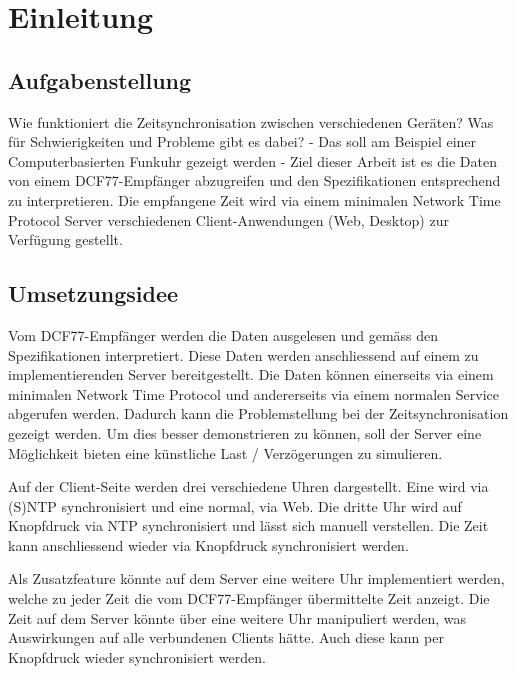 
\chapter{Einleitung}



\section{Aufgabenstellung}

Wie funktioniert die Zeitsynchronisation zwischen verschiedenen Geräten? Was für Schwierigkeiten und Probleme gibt es dabei? - Das soll am Beispiel einer Computerbasierten Funkuhr gezeigt werden - Ziel dieser Arbeit ist es die Daten von einem DCF77-Empfänger abzugreifen und den Spezifikationen entsprechend zu interpretieren. Die empfangene Zeit wird via einem minimalen Network Time Protocol Server verschiedenen Client-Anwendungen (Web, Desktop) zur Verfügung gestellt.

\section{Umsetzungsidee}

Vom DCF77-Empfänger werden die Daten ausgelesen und gemäss den Spezifikationen interpretiert. Diese Daten werden anschliessend auf einem zu implementierenden Server bereitgestellt. Die Daten können einerseits via einem minimalen Network Time Protocol und andererseits via einem normalen Service abgerufen werden. Dadurch kann die Problemstellung bei der Zeitsynchronisation gezeigt werden. Um dies besser demonstrieren zu können, soll der Server eine Möglichkeit bieten eine künstliche Last / Verzögerungen zu simulieren.

Auf der Client-Seite werden drei verschiedene Uhren dargestellt. Eine wird via (S)NTP synchronisiert und eine normal, via Web. Die dritte Uhr wird auf Knopfdruck via NTP synchronisiert und lässt sich manuell verstellen. Die Zeit kann anschliessend wieder via Knopfdruck synchronisiert werden.

Als Zusatzfeature könnte auf dem Server eine weitere Uhr implementiert werden, welche zu jeder Zeit die vom DCF77-Empfänger übermittelte Zeit anzeigt. Die Zeit auf dem Server könnte über eine weitere Uhr manipuliert werden, was Auswirkungen auf alle verbundenen Clients hätte. Auch diese kann per Knopfdruck wieder synchronisiert werden.